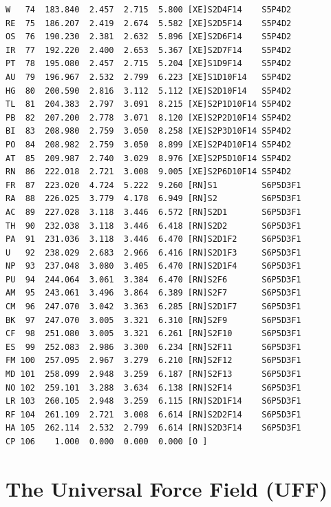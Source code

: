 \documentclass[final,12pt,makeidx,DIV=calc]{article}
\begin{document}
{{{{{{\begin{verbatim}
W   74  183.840  2.457  2.715  5.800 [XE]S2D4F14    S5P4D2    
RE  75  186.207  2.419  2.674  5.582 [XE]S2D5F14    S5P4D2    
OS  76  190.230  2.381  2.632  5.896 [XE]S2D6F14    S5P4D2    
IR  77  192.220  2.400  2.653  5.367 [XE]S2D7F14    S5P4D2    
PT  78  195.080  2.457  2.715  5.204 [XE]S1D9F14    S5P4D2    
AU  79  196.967  2.532  2.799  6.223 [XE]S1D10F14   S5P4D2    
HG  80  200.590  2.816  3.112  5.112 [XE]S2D10F14   S5P4D2    
TL  81  204.383  2.797  3.091  8.215 [XE]S2P1D10F14 S5P4D2    
PB  82  207.200  2.778  3.071  8.120 [XE]S2P2D10F14 S5P4D2    
BI  83  208.980  2.759  3.050  8.258 [XE]S2P3D10F14 S5P4D2    
PO  84  208.982  2.759  3.050  8.899 [XE]S2P4D10F14 S5P4D2    
AT  85  209.987  2.740  3.029  8.976 [XE]S2P5D10F14 S5P4D2    
RN  86  222.018  2.721  3.008  9.005 [XE]S2P6D10F14 S5P4D2    
FR  87  223.020  4.724  5.222  9.260 [RN]S1         S6P5D3F1  
RA  88  226.025  3.779  4.178  6.949 [RN]S2         S6P5D3F1  
AC  89  227.028  3.118  3.446  6.572 [RN]S2D1       S6P5D3F1  
TH  90  232.038  3.118  3.446  6.418 [RN]S2D2       S6P5D3F1  
PA  91  231.036  3.118  3.446  6.470 [RN]S2D1F2     S6P5D3F1  
U   92  238.029  2.683  2.966  6.416 [RN]S2D1F3     S6P5D3F1  
NP  93  237.048  3.080  3.405  6.470 [RN]S2D1F4     S6P5D3F1  
PU  94  244.064  3.061  3.384  6.470 [RN]S2F6       S6P5D3F1  
AM  95  243.061  3.496  3.864  6.389 [RN]S2F7       S6P5D3F1  
CM  96  247.070  3.042  3.363  6.285 [RN]S2D1F7     S6P5D3F1  
BK  97  247.070  3.005  3.321  6.310 [RN]S2F9       S6P5D3F1  
CF  98  251.080  3.005  3.321  6.261 [RN]S2F10      S6P5D3F1  
ES  99  252.083  2.986  3.300  6.234 [RN]S2F11      S6P5D3F1  
FM 100  257.095  2.967  3.279  6.210 [RN]S2F12      S6P5D3F1  
MD 101  258.099  2.948  3.259  6.187 [RN]S2F13      S6P5D3F1  
NO 102  259.101  3.288  3.634  6.138 [RN]S2F14      S6P5D3F1  
LR 103  260.105  2.948  3.259  6.115 [RN]S2D1F14    S6P5D3F1  
RF 104  261.109  2.721  3.008  6.614 [RN]S2D2F14    S6P5D3F1  
HA 105  262.114  2.532  2.799  6.614 [RN]S2D3F14    S6P5D3F1  
CP 106    1.000  0.000  0.000  0.000 [0 ]                     
\end{verbatim}
\normalsize

\newpage
\section{The Universal Force Field (UFF)}
\label{sec:UFF}

}}}}}}
\end{document}
